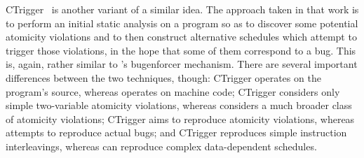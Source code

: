 CTrigger~\cite{Zhou} is another variant of a similar idea.  The
approach taken in that work is to perform an initial static analysis
on a program so as to discover some potential atomicity violations and
to then construct alternative schedules which attempt to trigger those
violations, in the hope that some of them correspond to a bug.  This
is, again, rather similar to {\technique}'s \gls{bugenforcer}
mechanism.  There are several important differences between the two
techniques, though: CTrigger operates on the program's source, whereas
{\technique} operates on machine code; CTrigger considers only simple
two-variable atomicity violations, whereas {\technique} considers a
much broader class of atomicity violations; CTrigger aims to reproduce
atomicity violations, whereas {\technique} attempts to reproduce
actual bugs; and CTrigger reproduces simple instruction interleavings,
whereas {\technique} can reproduce complex data-dependent schedules.

